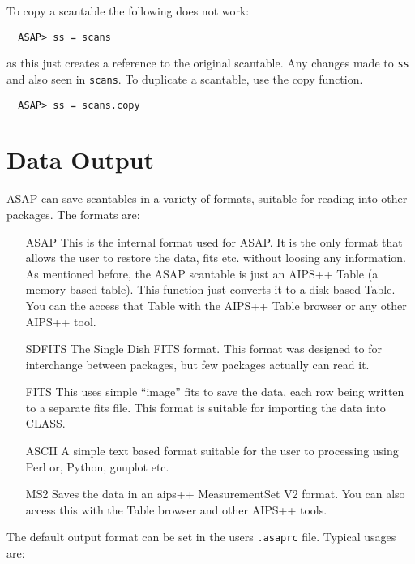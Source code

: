 \documentclass[11pt]{article}
\newcommand{\cmd}[1]{{\tt #1}}
\begin{document}
To copy a scantable the following does not work:

\begin{verbatim}
  ASAP> ss = scans
\end{verbatim}

as this just creates a reference to the original scantable. Any changes
made to \cmd{ss} and also seen in \cmd{scans}. To duplicate a
scantable, use the copy function.

\begin{verbatim}
  ASAP> ss = scans.copy
\end{verbatim}

\section{Data Output}

ASAP can save scantables in a variety of formats, suitable for reading
into other packages. The formats are:

\begin{itemize}
\item[ASAP] This is the internal format used for ASAP. It is the only
format that allows the user to restore the data, fits etc. without
loosing any information.   As mentioned before, the ASAP scantable 
is just an AIPS++ Table (a memory-based table).
This function just converts it to a  disk-based
Table.  You can the access that Table with the AIPS++ Table browser
or any other AIPS++ tool.

\item[SDFITS] The Single Dish FITS format. This format was
designed to for interchange between packages, but few packages
actually can read it.

\item[FITS] This uses simple ``image'' fits to save the data, each row
being written to a separate fits file. This format is suitable for
importing the data into CLASS.

\item[ASCII] A simple text based format suitable for the user to
processing using Perl or, Python, gnuplot etc.

\item[MS2] Saves the data in an aips++ MeasurementSet V2 format.
You can also access this with the Table browser and other AIPS++
tools.

\end{itemize}

The default output format can be set in the users {\tt .asaprc} file. 
Typical usages are:
\end{document}

